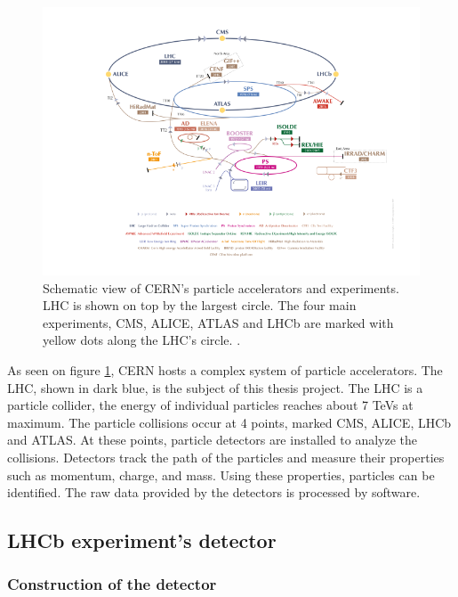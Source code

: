 \documentclass[12pt]{article}
\begin{document}
\begin{figure}[H]
	\includegraphics[width=\textwidth]{accelerator_complex}
	\caption[CERN accelerator complex]{Schematic view of CERN's particle accelerators and experiments. LHC is shown on top by the largest circle. The four main experiments, CMS, ALICE, ATLAS and LHCb are marked with yellow dots along the LHC's circle. \cite{cern_document_server}.}
	\label{fig_accel_complex}
\end{figure}

As seen on figure \ref{fig_accel_complex}, CERN hosts a complex system of particle accelerators\cite{cern_accel_complex}.
The LHC, shown in dark blue, is the subject of this thesis project. The LHC is a particle collider, the energy of individual particles reaches about 7 TeVs at maximum. The particle collisions occur at 4 points, marked CMS, ALICE, LHCb and ATLAS. At these points, particle detectors are installed to analyze the collisions. Detectors track the path of the particles and measure their properties such as momentum, charge, and mass. Using these properties, particles can be identified. The raw data provided by the detectors is processed by software.


\subsection{LHCb experiment's detector}\label{sec_lhcb_detector}	

\subsubsection{Construction of the detector}\label{sec_lhcb_det_constr}
\end{document}
